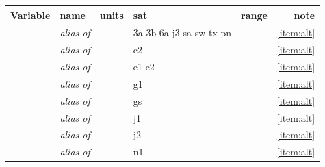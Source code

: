 \documentclass[a4paper,11pt,openany,natbib,nomargin]{thesis}
\newcommand\alias[1]{\emph{alias of} \var{#1}}
\newenvironment{vartable}{
\begin{table}[ht]
\small
\begin{tabular}{lllllr}
\hline\hline
Variable & name & units & sat & range & note \\
\hline\hline
}{
\hline
\end{tabular}
\end{table}
}
\begin{document}
\begin{vartable}
\hline
\var{alt} & \alias{alt_gdrf} & & 3a 3b 6a j3 sa sw tx pn && \ref{item:alt} \\
\var{alt} & \alias{alt_gdre} \var{alt_cnes} & & c2 && \ref{item:alt} \\
\var{alt} & \alias{alt_reaper} \var{alt_gfz} & & e1 e2 && \ref{item:alt} \\
\var{alt} & \alias{alt_pgs7777} & & g1 && \ref{item:alt} \\
\var{alt} & \alias{alt_gdrcp} & & gs && \ref{item:alt} \\
\var{alt} & \alias{alt_gdre} & & j1 && \ref{item:alt} \\
\var{alt} & \alias{alt_gdre} \var{alt_gdrd} & & j2 && \ref{item:alt} \\
\var{alt} & \alias{alt_gdrd} \var{alt_gdrcp} & & n1 && \ref{item:alt} \\
\end{vartable}
\end{document}
